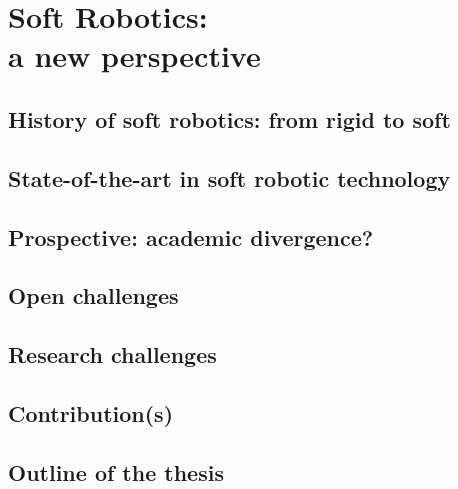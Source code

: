\chapter[Soft Robots -- a new perspective on biomimicry]{Soft Robotics: \\ a new perspective}
\label{chap: chapter 1}
\vspace*{-5mm}

\section{History of soft robotics: from rigid to soft} \label{sec: chap1 0_history}


\section{State-of-the-art in soft robotic technology} \label{sec: chap1 0_SOT}

\section{Prospective: academic divergence?} \label{sec: chap1 0_SOT}

\section{Open challenges}

\section{Research challenges}

\section{Contribution(s)}
%
%
%
%

\section{Outline of the thesis}

